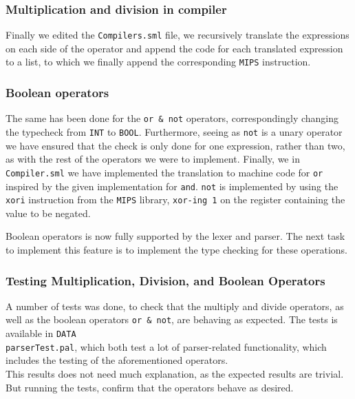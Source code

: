 \documentclass[10pt]{article}
\begin{document}
\subsubsection{Multiplication and division in compiler}
Finally we edited the \texttt{Compilers.sml} file, we recursively translate the expressions on each side of the operator and append the code for each translated expression to a list, to which we finally append the corresponding \texttt{MIPS} instruction.

\subsubsection{Boolean operators}
The same has been done for the \texttt{or \& not} operators, correspondingly changing the typecheck from \texttt{INT} to \texttt{BOOL}. Furthermore, seeing as \texttt{not} is a unary operator we have ensured that the check is only done for one expression, rather than two, as with the rest of the operators we were to implement. Finally, we in \texttt{Compiler.sml} we have implemented the translation to machine code for \texttt{or} inspired by the given implementation for \texttt{and}. \texttt{not} is implemented by using the \texttt{xori} instruction from the \texttt{MIPS} library, \texttt{xor-ing 1} on the register containing the value to be negated.

Boolean operators is now fully supported by the lexer and parser. The next task to implement this feature is to implement the type checking for these operations.

\subsubsection{Testing Multiplication, Division, and Boolean Operators}
A number of tests was done, to check that the multiply and divide operators, as well as the boolean operators \texttt{or \& not}, are behaving as expected. The tests is available in \texttt{DATA\\parserTest.pal}, which both test a lot of parser-related functionality, which includes the testing of the aforementioned operators.\\

This results does not need much explanation, as the expected results are trivial. But running the tests, confirm that the operators behave as desired.
\end{document}
